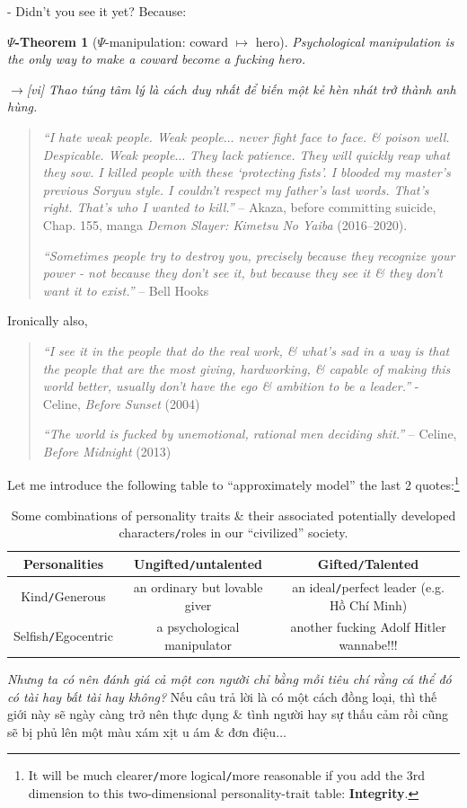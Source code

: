 \documentclass[12pt,twoside]{book}
\newtheorem{psy-theorem}{$\Psi$-Theorem}
\begin{document}
- Didn't you see it yet? Because:
\begin{psy-theorem}[$\Psi$-manipulation: coward $\mapsto$ hero]
	Psychological manipulation is the only way to make a coward become a fucking hero.
	
	{\sf[en]$\to$[vi]} Thao túng tâm lý là cách duy nhất để biến một kẻ hèn nhát trở thành anh hùng.
\end{psy-theorem}

\begin{quotation}
	{\it``I hate weak people. Weak people$\ldots$ never fight face to face. \& poison well. Despicable. Weak people$\ldots$ They lack patience. They will quickly reap what they sow. I killed people with these `protecting fists'. I blooded my master's previous Soryuu style. I couldn't respect my father's last words. That's right. That's who I wanted to kill.''} -- {\sf Akaza}, before committing suicide, Chap. 155, manga {\it Demon Slayer: Kimetsu No Yaiba} (2016--2020).
	
	{\it``Sometimes people try to destroy you, precisely because they recognize your power - not because they don't see it, but because they see it \& they don't want it to exist.''} -- {\sc Bell Hooks}
\end{quotation}
Ironically also,

\begin{quotation}
	{\it``I see it in the people that do the real work, \& what's sad in a way is that the people that are the most giving, hardworking, \& capable of making this world better, usually don't have the ego \& ambition to be a leader.''} - {\sf Celine}, {\it Before Sunset} (2004)
	
	{\it``The world is fucked by unemotional, rational men deciding shit.''} -- {\sf Celine}, {\it Before Midnight} (2013)
\end{quotation}
Let me introduce the following table to ``approximately model'' the last 2 quotes:\footnote{It will be much clearer{\tt/}more logical{\tt/}more reasonable if you add the 3rd dimension to this two-dimensional personality-trait table: {\bf Integrity}.}

\begin{table}[h]
	\centering
	\begin{tabular}{|c|c|c|}
		\hline
		 Personalities & Ungifted{\tt/}untalented & Gifted{\tt/}Talented \\
		\hline
		Kind{\tt/}Generous & an ordinary but lovable giver & an ideal{\tt/}perfect leader (e.g. Hồ Chí Minh) \\
		\hline
		Selfish{\tt/}Egocentric & a psychological manipulator & another fucking Adolf Hitler wannabe!!! \\
		\hline
	\end{tabular}
	\caption{Some combinations of personality traits \& their associated potentially developed characters{\tt/}roles in our ``civilized'' society.}
\end{table}
{\it Nhưng ta có nên đánh giá cả một con người chỉ bằng mỗi tiêu chí rằng cá thể đó có tài hay bất tài hay không?} Nếu câu trả lời là có một cách đồng loại, thì thế giới này sẽ ngày càng trở nên thực dụng \& tình người hay sự thấu cảm rồi cũng sẽ bị phủ lên một màu xám xịt u ám \& đơn điệu$\ldots$
\end{document}

